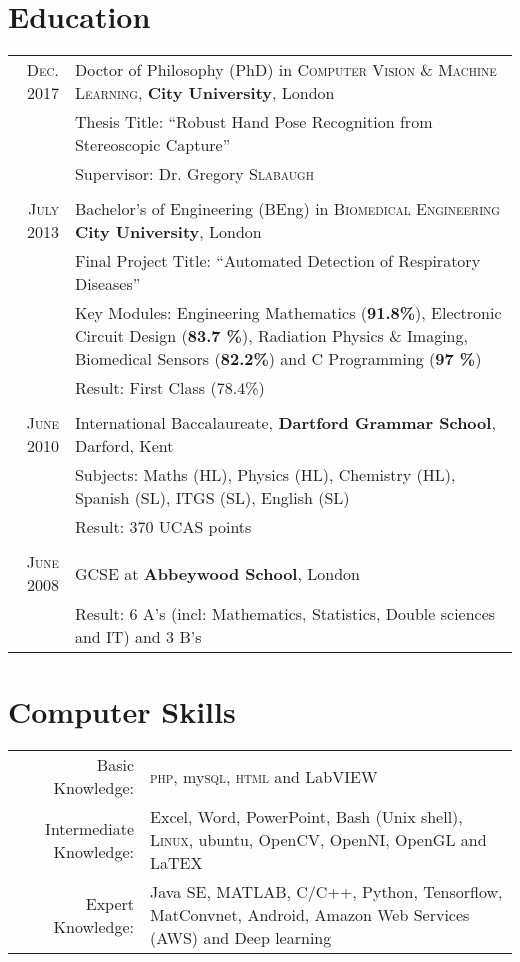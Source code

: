 \documentclass[letterpaper,11pt]{article}
\begin{document}
\section{Education}
\begin{tabular}{rp{14cm}}	
 \textsc{Dec.} 2017 & Doctor of Philosophy (PhD) in \textsc{Computer Vision \& Machine Learning}, \textbf{City University}, London\\
& Thesis Title: ``Robust Hand Pose Recognition from Stereoscopic Capture'' \\
& \small Supervisor: Dr. Gregory \textsc{Slabaugh}\\
\\

\textsc{July} 2013 & Bachelor's of Engineering (BEng) in \textsc{Biomedical Engineering} \textbf{City University}, London \\
& Final Project Title: ``Automated Detection of Respiratory Diseases'' \\
& \small Key Modules: Engineering Mathematics (\textbf{91.8\%}), Electronic Circuit Design (\textbf{83.7 \%}), Radiation Physics \& Imaging, Biomedical Sensors (\textbf{82.2\%}) and C Programming (\textbf{97 \%})\\
& \small Result: First Class (78.4\%)\\
\\

\textsc{June} 2010 & International Baccalaureate, \textbf{Dartford Grammar School}, Darford, Kent\\
& \small Subjects: Maths (HL), Physics (HL), Chemistry (HL), Spanish (SL), ITGS (SL), English (SL) \\
& \small Result:  370 UCAS points \\&\\

\textsc{June} 2008 & GCSE at \textbf{Abbeywood School}, London \\
& \small Result: 6 A's (incl: Mathematics, Statistics, Double sciences and IT) and  3 B's  \\
\end{tabular}


\section{Computer Skills}
\begin{tabular}{rp{12cm}}
Basic Knowledge: & \textsc{php}, my\textsc{sql}, \textsc{html} and LabVIEW \\
Intermediate Knowledge: & Excel, Word, PowerPoint, Bash (Unix shell), \textsc{Linux}, ubuntu, OpenCV, OpenNI, OpenGL and LaTEX \\
Expert Knowledge: & Java SE, MATLAB, C/C++, Python, Tensorflow, MatConvnet, Android, Amazon Web Services (AWS) and Deep learning
\end{tabular}
\end{document}
